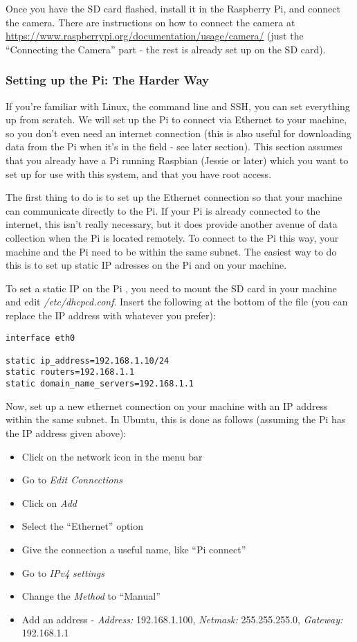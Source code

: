 \documentclass[10pt]{article}
\begin{document}
Once you have the SD card flashed, install it in the Raspberry Pi, and connect the camera. There are instructions on how to connect the camera at
\url{https://www.raspberrypi.org/documentation/usage/camera/} (just the ``Connecting the Camera'' part - the rest is already set up on the SD card).

\subsubsection{Setting up the Pi: The Harder Way}
If you're familiar with Linux, the command line and SSH, you can set everything up from scratch. We will set up the Pi to connect via Ethernet to your machine, so you don't
even need an internet connection (this is also useful for downloading data from the Pi when it's in the field - see later section). This section assumes that you already
have a Pi running Raspbian (Jessie or later) which you want to set up for use with this system, and that you have root access. 

The first thing to do is to set up the Ethernet connection so that your machine can communicate directly to the Pi. If your Pi is already connected to the internet, this
isn't really necessary, but it does provide another avenue of data collection when the Pi is located remotely. To connect to the Pi this way, your machine and the Pi 
need to be within the same subnet. The easiest way to do this is to set up static IP adresses on the Pi and on your machine.

To set a static IP on the Pi , you need to mount the SD card in your machine and edit \textit{/etc/dhcpcd.conf}. Insert the following at the bottom of the file (you can 
replace the IP address with whatever you prefer):

\begin{verbatim}
interface eth0

static ip_address=192.168.1.10/24
static routers=192.168.1.1
static domain_name_servers=192.168.1.1
\end{verbatim}

Now, set up a new ethernet connection on your machine with an IP address within the same subnet. In Ubuntu, this is done as follows (assuming the Pi has the IP address
given above):

\begin{itemize}
 \item Click on the network icon in the menu bar
 \item Go to \textit{Edit Connections}
 \item Click on \textit{Add}
 \item Select the ``Ethernet'' option
 \item Give the connection a useful name, like ``Pi connect''
 \item Go to \textit{IPv4 settings}
 \item Change the \textit{Method} to ``Manual''
 \item Add an address - \textit{Address:} 192.168.1.100, \textit{Netmask:} 255.255.255.0, \textit{Gateway:} 192.168.1.1
\end{itemize}
\end{document}
